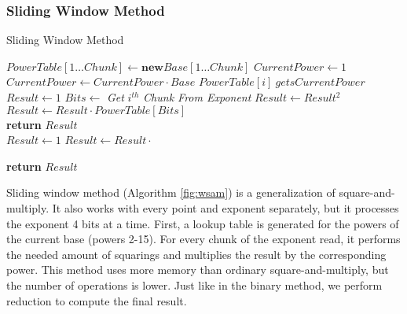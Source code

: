 \subsubsection{Sliding Window Method}
\begin{algorithm}[h]
    \caption{Sliding Window Method}\label{fig:wsam}
    \begin{algorithmic}[1]
        \State $PowerTable[1 \dots Chunk] \gets \textbf{new} Base[1 \dots Chunk]$
        \State $CurrentPower \gets 1$
        \\
            \State $CurrentPower \gets CurrentPower \cdot Base$
            \State $PowerTable[i] \ gets CurrentPower$
        \EndFor
        \\
        \State $Result \gets 1$
            \State $Bits \gets $ \textit{Get }$i^{th}$ \textit{ Chunk From Exponent}
                \State $Result \gets Result^2$
            \EndFor
            \\
                \State $Result \gets Result \cdot PowerTable[Bits]$
            \EndIf
        \EndFor
        \\
        \State \textbf{return} $Result$
    \EndFunction
    \\
        \State $Result \gets 1$
            \State $Result \gets Result \cdot $
        \EndFor
    
        \State \textbf{return} $Result$
        
    \EndFunction
    \end{algorithmic}
\end{algorithm}
Sliding window method \cite{knuth2014art} (Algorithm \ref{fig:wsam}) is a generalization of square-and-multiply. It also works with every point and exponent separately, but it processes the exponent 4 bits at a time. First, a lookup table is generated for the powers of the current base (powers 2-15). For every chunk of the exponent read, it performs the needed amount of squarings and multiplies the result by the corresponding power. This method uses more memory than ordinary square-and-multiply, but the number of operations is lower. Just like in the binary method, we perform reduction to compute the final result.

